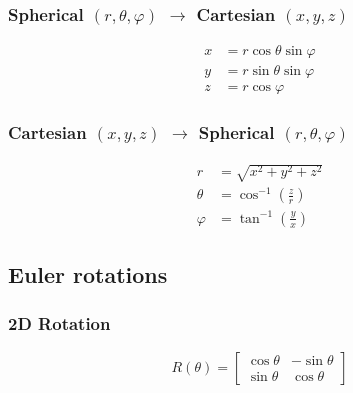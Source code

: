 \documentclass[twocolumn]{article}
\newcommand{\phase}{\varphi}
\begin{document}
\subsubsection*{Spherical $(r,\theta,\phase)$ $\rightarrow$ Cartesian $(x,y,z)$}
\begin{equation}
    \begin{aligned}
        x &= r \cos\theta\sin\phase \\
        y &= r \sin\theta\sin\phase \\
        z &= r \cos\phase
    \end{aligned}
\end{equation}
\subsubsection*{Cartesian $(x,y,z)$ $\rightarrow$ Spherical $(r,\theta,\phase)$}
\begin{equation}
    \begin{aligned}
        r &= \sqrt{x^2+y^2+z^2} \\
        \theta &= \cos^{-1} \left(\frac{z}{r}\right) \\
        \phase &= \tan^{-1} \left(\frac{y}{x}\right)
    \end{aligned}
\end{equation}

\subsection{Euler rotations}

\subsubsection*{2D Rotation}
\begin{equation}
    R(\theta) = \begin{bmatrix}
        \cos\theta & -\sin\theta \\
        \sin\theta & \cos\theta
    \end{bmatrix}
\end{equation}
\end{document}
